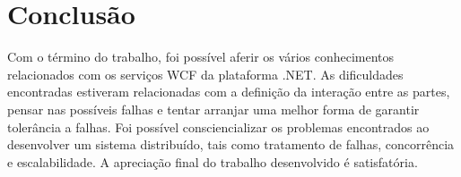 \chapter{Conclusão} \label{conclusao}

Com o término do trabalho, foi possível aferir os vários conhecimentos relacionados com os serviços WCF da plataforma .NET.
As dificuldades encontradas estiveram relacionadas com a definição da interação entre as partes, pensar nas possíveis falhas e tentar arranjar uma melhor forma de garantir tolerância a falhas. Foi possível consciencializar os problemas encontrados ao desenvolver um sistema distribuído, tais como tratamento de falhas, concorrência e escalabilidade.
A apreciação final do trabalho desenvolvido é satisfatória.